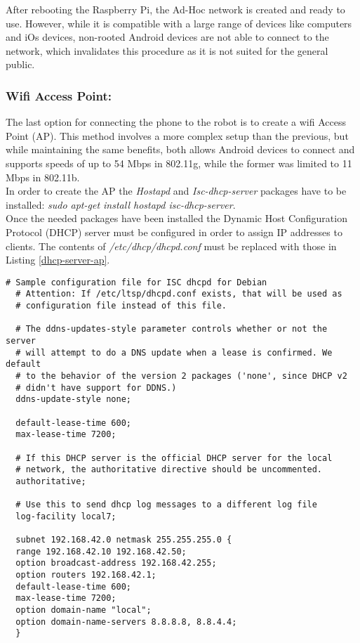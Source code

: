 \bigskip	
After rebooting the Raspberry Pi, the Ad-Hoc network is created and ready to use. However, while it is compatible with a large range of devices like computers and iOs devices, non-rooted Android devices are not able to connect to the network, which invalidates this procedure as it is not suited for the general public.


\subsubsection{Wifi Access Point:}

The last option for connecting the phone to the robot is to create a wifi Access Point (AP). This method involves a more complex setup than the previous, but while maintaining the same benefits, both allows Android devices to connect and supports speeds of up to 54 Mbps in 802.11g, while the former was limited to 11 Mbps in 802.11b.\\

In order to create the AP the  \textit{Hostapd} and  \textit{Isc-dhcp-server} packages have to be installed: \textit{sudo apt-get install hostapd isc-dhcp-server}.\\

Once the needed packages have been installed the Dynamic Host Configuration Protocol (DHCP) server must be configured in order to assign IP addresses to clients. The contents of \textit{/etc/dhcp/dhcpd.conf} must be replaced with those in Listing \ref{dhcp-server-ap}. \\

	\begin{minipage}{\linewidth}%
	\begin{lstlisting}[label=dhcp-server-ap,caption=DHCP Server Configuration {[} /etc/dhcp/dhcpd.conf {]}  ]
  # Sample configuration file for ISC dhcpd for Debian
  # Attention: If /etc/ltsp/dhcpd.conf exists, that will be used as
  # configuration file instead of this file.

  # The ddns-updates-style parameter controls whether or not the server
  # will attempt to do a DNS update when a lease is confirmed. We default 
  # to the behavior of the version 2 packages ('none', since DHCP v2 
  # didn't have support for DDNS.)
  ddns-update-style none;

  default-lease-time 600;
  max-lease-time 7200;

  # If this DHCP server is the official DHCP server for the local
  # network, the authoritative directive should be uncommented.
  authoritative;

  # Use this to send dhcp log messages to a different log file 
  log-facility local7;

  subnet 192.168.42.0 netmask 255.255.255.0 {
  range 192.168.42.10 192.168.42.50;
  option broadcast-address 192.168.42.255;
  option routers 192.168.42.1;
  default-lease-time 600;
  max-lease-time 7200;
  option domain-name "local";
  option domain-name-servers 8.8.8.8, 8.8.4.4;
  }
	\end{lstlisting}
	\end{minipage}

